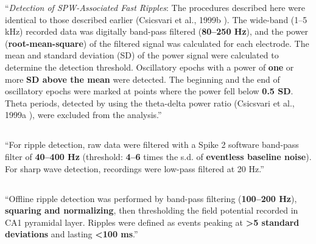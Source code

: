 \begin{quotebar}
``\emph{Detection of SPW-Associated Fast Ripples}: The procedures described here were identical to those described earlier (Csicsvari et al., 1999b \cite{Csicsvari1999a}). The wide-band (1–5 kHz) recorded data was digitally band-pass filtered (\textbf{80–250 Hz}), and the power (\textbf{root-mean-square}) of the filtered signal was calculated for each electrode. The mean and standard deviation (SD) of the power signal were calculated to determine the detection threshold. Oscillatory epochs with a power of \textbf{one} or more \textbf{SD above the mean} were detected. The beginning and the end of oscillatory epochs were marked at points where the power fell below \textbf{0.5 SD}. Theta periods, detected by using the theta-delta power ratio (Csicsvari et al., 1999a \cite{Csicsvari1999}), were excluded from the analysis.'' \cite{Csicsvari2000}
\end{quotebar}


\subsection{}

\begin{quotebar}
``For ripple detection, raw data were filtered with a Spike 2 software band-pass filter of \textbf{40--400 Hz} (threshold: \textbf{4--6} times the s.d. of \textbf{eventless baseline noise}). For sharp wave detection, recordings were low-pass filtered at 20 Hz.'' \cite{Behrens2005}
\end{quotebar}


\subsection{}

\begin{quotebar}
``Offline ripple detection was performed by band-pass filtering (\textbf{100--200 Hz}), \textbf{squaring and normalizing}, then thresholding the field potential recorded in CA1 pyramidal layer. Ripples were defined as events peaking at \textbf{>5 standard deviations} and lasting \textbf{<100 ms}.'' \cite{Girardeau2009}
\end{quotebar}


\subsection{}

